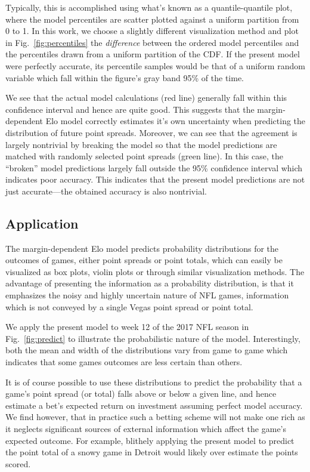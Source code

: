 \documentclass[aps,prc,reprint,amsmath,superscriptaddress,nofootinbib]{revtex4-1}
\begin{document}
Typically, this is accomplished using what's known as a quantile-quantile plot, where the model percentiles are scatter plotted against a uniform partition from 0 to 1.
In this work, we choose a slightly different visualization method and plot in Fig.~\ref{fig:percentiles} the \emph{difference} between the ordered model percentiles and the percentiles drawn from a uniform partition of the CDF.
If the present model were perfectly accurate, its percentile samples would be that of a uniform random variable which fall within the figure's gray band 95\% of the time.

We see that the actual model calculations (red line) generally fall within this confidence interval and hence are quite good.
This suggests that the margin-dependent Elo model correctly estimates it's own uncertainty when predicting the distribution of future point spreads.
Moreover, we can see that the agreement is largely nontrivial by breaking the model so that the model predictions are matched with randomly selected point spreads (green line).
In this case, the ``broken'' model predictions largely fall outside the 95\% confidence interval which indicates poor accuracy.
This indicates that the present model predictions are not just accurate---the obtained accuracy is also nontrivial.

\subsection{Application}

The margin-dependent Elo model predicts probability distributions for the outcomes of games, either point spreads or point totals, which can easily be visualized as box plots, violin plots or through similar visualization methods.
The advantage of presenting the information as a probability distribution, is that it emphasizes the noisy and highly uncertain nature of NFL games, information which is not conveyed by a single Vegas point spread or point total.

We apply the present model to week 12 of the 2017 NFL season in Fig.~\ref{fig:predict} to illustrate the probabilistic nature of the model.
Interestingly, both the mean and width of the distributions vary from game to game which indicates that some games outcomes are less certain than others.

It is of course possible to use these distributions to predict the probability that a game's point spread (or total) falls above or below a given line, and hence estimate a bet's expected return on investment assuming perfect model accuracy.
We find however, that in practice such a betting scheme will not make one rich as it neglects significant sources of external information which affect the game's expected outcome.
For example, blithely applying the present model to predict the point total of a snowy game in Detroit would likely over estimate the points scored.
\end{document}
